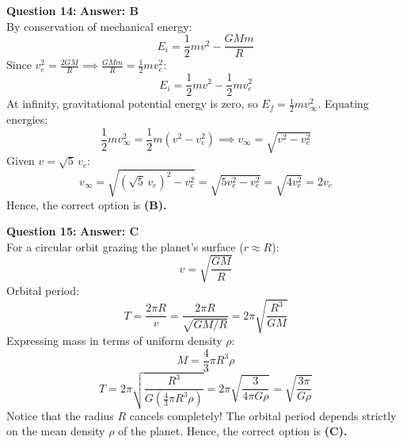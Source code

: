 \documentclass[11pt,a4paper]{article}
\begin{document}
\begin{tcolorbox}[solbox]
  \textbf{\textcolor{primaryDark}{Question 14:}} \hfill \textbf{\textcolor{l3Crimson}{Answer: B}}\\
  \vspace{3pt}
  By conservation of mechanical energy:
$$E_i = \frac{1}{2}m v^2 - \frac{GMm}{R}$$
Since $v_e^2 = \frac{2GM}{R} \implies \frac{GMm}{R} = \frac{1}{2}m v_e^2$:
$$E_i = \frac{1}{2}m v^2 - \frac{1}{2}m v_e^2$$
\vspace{3pt}
At infinity, gravitational potential energy is zero, so $E_f = \frac{1}{2}m v_\infty^2$.
Equating energies:
$$\frac{1}{2}m v_\infty^2 = \frac{1}{2}m(v^2 - v_e^2) \implies v_\infty = \sqrt{v^2 - v_e^2}$$
\vspace{3pt}
Given $v = \sqrt{5}\,v_e$:
$$v_\infty = \sqrt{(\sqrt{5}\,v_e)^2 - v_e^2} = \sqrt{5v_e^2 - v_e^2} = \sqrt{4v_e^2} = 2v_e$$
\vspace{3pt}
Hence, the correct option is \textbf{(B)}\textbf{.}
\end{tcolorbox}
\vspace{3pt}

\begin{tcolorbox}[solbox]
  \textbf{\textcolor{primaryDark}{Question 15:}} \hfill \textbf{\textcolor{l3Crimson}{Answer: C}}\\
  \vspace{3pt}
  For a circular orbit grazing the planet's surface ($r \approx R$):
$$v = \sqrt{\frac{GM}{R}}$$
Orbital period:
$$T = \frac{2\pi R}{v} = \frac{2\pi R}{\sqrt{GM/R}} = 2\pi \sqrt{\frac{R^3}{GM}}$$
\vspace{3pt}
Expressing mass in terms of uniform density $\rho$:
$$M = \frac{4}{3}\pi R^3 \rho$$
$$T = 2\pi \sqrt{\frac{R^3}{G\left(\frac{4}{3}\pi R^3 \rho\right)}} = 2\pi \sqrt{\frac{3}{4\pi G \rho}} = \sqrt{\frac{3\pi}{G\rho}}$$
\vspace{3pt}
Notice that the radius $R$ cancels completely! The orbital period depends strictly on the mean density $\rho$ of the planet.
\vspace{3pt}
Hence, the correct option is \textbf{(C)}\textbf{.}
\end{tcolorbox}
\vspace{3pt}
\end{document}
